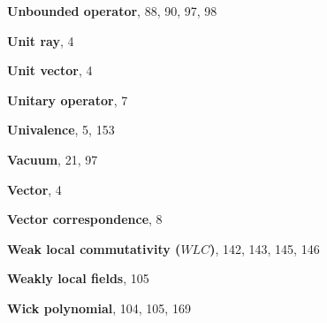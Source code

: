 \begin{theindex}
\indexspace
\item \textbf{Unbounded operator}, 88, 90, 97, 98
\item \textbf{Unit ray}, 4
\item \textbf{Unit vector}, 4
\item \textbf{Unitary operator}, 7
\item \textbf{Univalence}, 5, 153

\indexspace
\item \textbf{Vacuum}, 21, 97
\item \textbf{Vector}, 4
\item \textbf{Vector correspondence}, 8

\indexspace
\item \textbf{Weak local commutativity ($WLC$)}, 142, 143, 145, 146
\item \textbf{Weakly local fields}, 105
\item \textbf{Wick polynomial}, 104, 105, 169

\end{theindex}
\endgroup
